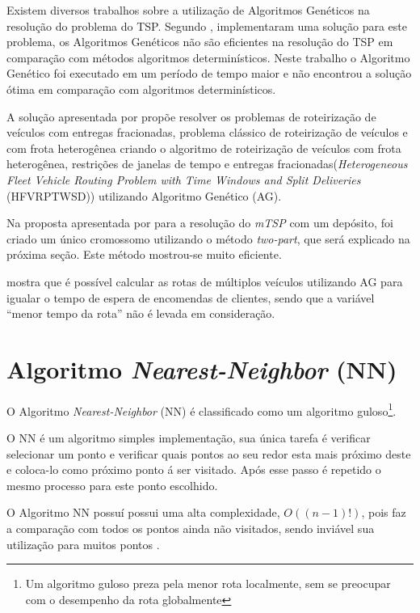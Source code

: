 \documentclass{abnt}
\begin{document}
			Existem diversos trabalhos sobre a utilização de Algoritmos Genéticos na resolução do problema do TSP.
			Segundo , implementaram uma solução para este problema, os Algoritmos Genéticos não são eficientes 
			na resolução do TSP em comparação com métodos algoritmos determinísticos. Neste trabalho o Algoritmo Genético foi executado em um período de tempo maior e não encontrou a solução ótima em comparação com algoritmos determinísticos.

			A solução apresentada por  propõe resolver os problemas de roteirização de 
			veículos com entregas fracionadas, problema clássico de roteirização de veículos e com 
			frota heterogênea criando o algoritmo de roteirização de veículos com frota heterogênea, 
			restrições de janelas de tempo e entregas fracionadas(\textit{Heterogeneous Fleet Vehicle 
			Routing Problem with Time Windows and Split Deliveries} (HFVRPTWSD)) utilizando Algoritmo 
			Genético (AG).

			Na proposta  apresentada por  para a resolução do \textit{mTSP} com um depósito, foi criado um único cromossomo utilizando o método \textit{two-part}, que será explicado na próxima seção. Este método mostrou-se muito eficiente.

			  mostra que é possível calcular as rotas de múltiplos veículos utilizando AG para igualar o tempo 
			de espera de encomendas de clientes, sendo que a variável ``menor tempo da rota'' não é levada em consideração.


		\chapter{Algoritmo \textit{Nearest-Neighbor} (NN)}

			O Algoritmo \textit{Nearest-Neighbor} (NN) é classificado como um algoritmo guloso\footnote{Um algoritmo guloso preza pela menor rota localmente, sem se preocupar com o desempenho da rota globalmente}.

			O NN é um algoritmo simples implementação, sua única tarefa é verificar selecionar um ponto e verificar quais pontos ao seu redor esta mais próximo deste e coloca-lo como próximo ponto á ser visitado. Após esse passo é repetido o mesmo processo para este ponto escolhido. 

			O Algoritmo NN possuí possui uma alta complexidade, $O((n-1)!)$, pois faz a comparação com todos os pontos ainda não visitados, sendo inviável sua utilização para muitos pontos \cite{NN}.
	
\end{document}
